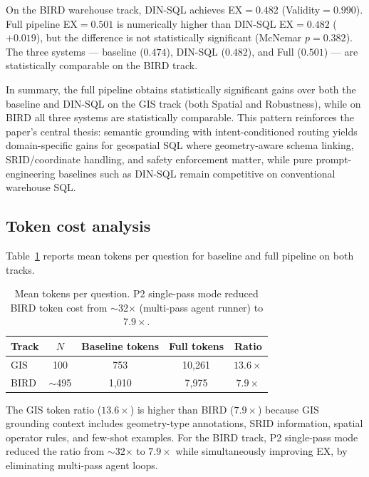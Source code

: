 \documentclass[11pt]{article}
\begin{document}
On the BIRD warehouse track, DIN-SQL achieves EX$=0.482$ (Validity$=0.990$). Full pipeline EX$=0.501$ is numerically higher than DIN-SQL EX$=0.482$ ($+0.019$), but the difference is not statistically significant (McNemar $p=0.382$). The three systems --- baseline ($0.474$), DIN-SQL ($0.482$), and Full ($0.501$) --- are statistically comparable on the BIRD track.

In summary, the full pipeline obtains statistically significant gains over both the baseline and DIN-SQL on the GIS track (both Spatial and Robustness), while on BIRD all three systems are statistically comparable. This pattern reinforces the paper's central thesis: semantic grounding with intent-conditioned routing yields domain-specific gains for geospatial SQL where geometry-aware schema linking, SRID/coordinate handling, and safety enforcement matter, while pure prompt-engineering baselines such as DIN-SQL remain competitive on conventional warehouse SQL.

\subsection{Token cost analysis}
\label{sec:tokens}

Table~\ref{tab:tokens} reports mean tokens per question for baseline and full pipeline on both tracks.

\begin{table}[t]
\centering
\caption{Mean tokens per question. P2 single-pass mode reduced BIRD token cost from $\sim$32$\times$ (multi-pass agent runner) to $7.9\times$.}
\label{tab:tokens}
\begin{tabular}{lcccc}
\toprule
Track & $N$ & Baseline tokens & Full tokens & Ratio \\
\midrule
GIS   & 100        & 753   & 10{,}261 & $13.6\times$ \\
BIRD  & $\sim$495  & 1{,}010 & 7{,}975 & $7.9\times$ \\
\bottomrule
\end{tabular}
\end{table}

The GIS token ratio ($13.6\times$) is higher than BIRD ($7.9\times$) because GIS grounding context includes geometry-type annotations, SRID information, spatial operator rules, and few-shot examples. For the BIRD track, P2 single-pass mode reduced the ratio from $\sim$32$\times$ to $7.9\times$ while simultaneously improving EX, by eliminating multi-pass agent loops.
\end{document}
